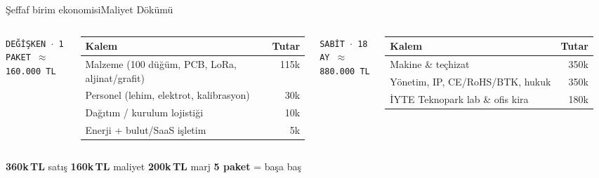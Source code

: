 \documentclass[aspectratio=169,11pt]{beamer}
\begin{document}
\begin{frame}{\c{S}effaf birim ekonomisi}{Maliyet D\"ok\"um\"u}
  \begin{columns}[T]
      {\footnotesize\color{ember}\texttt{DE\u{G}\.I\c{S}KEN \(\cdot\) 1 PAKET $\approx$ 160.000\,TL}}\par
      \vskip4pt
      {\scriptsize
        \begin{tabular}{@{}lr@{}}
          \toprule
          Kalem & Tutar \\
          \midrule
          Malzeme (100 d\"u\u{g}\"um, PCB, LoRa, aljinat/grafit) & {\color{myco}115k} \\
          Personel (lehim, elektrot, kalibrasyon) & {\color{myco}30k} \\
          Da\u{g}{\i}t{\i}m / kurulum lojisti\u{g}i & {\color{myco}10k} \\
          Enerji + bulut/SaaS i\c{s}letim & {\color{myco}5k} \\
          \bottomrule
        \end{tabular}
      }
      {\footnotesize\color{ember}\texttt{SAB\.IT \(\cdot\) 18 AY $\approx$ 880.000\,TL}}\par
      \vskip4pt
      {\scriptsize
        \begin{tabular}{@{}lr@{}}
          \toprule
          Kalem & Tutar \\
          \midrule
          Makine \& te\c{c}hizat & {\color{myco}350k} \\
          Y\"onetim, IP, CE/RoHS/BTK, hukuk & {\color{myco}350k} \\
          \.IYTE Teknopark lab \& ofis kira & {\color{myco}180k} \\
          \bottomrule
        \end{tabular}
      }
  \end{columns}
  \vskip10pt
  \begin{center}
    {\large\color{myco}\textbf{360k\,TL} sat{\i}\c{s}}\hspace{2em}
    {\large\color{ember}\textbf{160k\,TL} maliyet}\hspace{2em}
    {\large\color{mauve}\textbf{200k\,TL} marj}\hspace{2em}
    {\large\color{spore}\textbf{5 paket} = ba\c{s}a ba\c{s}}
  \end{center}
\end{frame}
\end{document}
